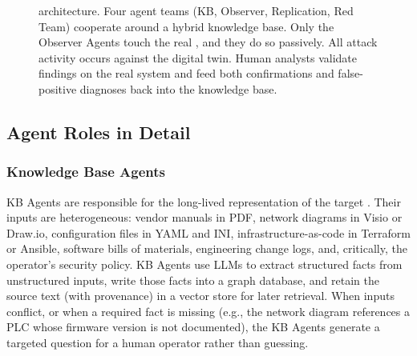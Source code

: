 \begin{figure}[t]
\caption{\sysname architecture. Four agent teams (KB, Observer,
Replication, Red Team) cooperate around a hybrid knowledge base. Only
the Observer Agents touch the real \cps, and they do so passively. All
attack activity occurs against the digital twin. Human analysts
validate findings on the real system and feed both confirmations and
false-positive diagnoses back into the knowledge base.}
\label{fig:arch}
\end{figure}

\subsection{Agent Roles in Detail}
\label{sec:approach-roles}

\subsubsection{Knowledge Base Agents}
KB Agents are responsible for the long-lived representation of the
target \cps. Their inputs are heterogeneous: vendor manuals in PDF,
network diagrams in Visio or Draw.io, configuration files in YAML and
INI, infrastructure-as-code in Terraform or Ansible, software bills of
materials, engineering change logs, and, critically, the operator's
security policy. KB Agents use LLMs to extract structured facts from
unstructured inputs, write those facts into a graph database, and
retain the source text (with provenance) in a vector store for later
retrieval. When inputs conflict, or when a required fact is missing
(e.g., the network diagram references a PLC whose firmware version is
not documented), the KB Agents generate a targeted question for a
human operator rather than guessing.

